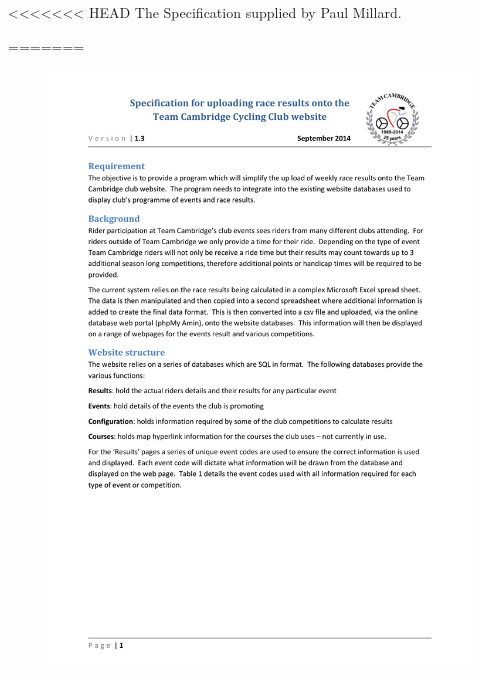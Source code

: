 <<<<<<< HEAD
The Specification supplied by Paul Millard.

=======
\begin{figure}[H]
    \includegraphics[width=\textwidth]{./TeamCambridgeSpec/page1.pdf}
\end{figure}

